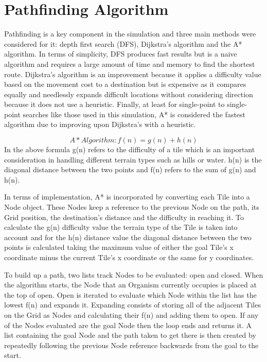 \documentclass[a4paper, oneside, 11pt]{report}
\begin{document}
\section{Pathfinding Algorithm}\label{pathfinding}
Pathfinding is a key component in the simulation and three main methods were considered for it: depth first search (DFS), Dijkstra's algorithm and the A* algorithm. In terms of simplicity, DFS produces fast results but is a naive algorithm and requires a large amount of time and memory to find the shortest route. Dijkstra's algorithm is an improvement because it applies a difficulty value based on the movement cost to a destination but is expensive as it compares equally and needlessly expands difficult locations without considering direction because it does not use a heuristic. Finally, at least for single-point to single-point searches like those used in this simulation, A* is considered the fastest algorithm \cite{belwariar} due to improving upon Dijkstra's with a heuristic. 

\[A* Algorithm: f(n) = g(n) + h(n)\]
In the above formula g(n) refers to the difficulty of a tile which is an important consideration in handling different terrain types such as hills or water. h(n) is the diagonal distance between the two points and f(n) refers to the sum of g(n) and h(n).

In terms of implementation, A* is incorporated by converting each Tile into a Node object. These Nodes keep a reference to the previous Node on the path, its Grid position, the destination's distance and the difficulty in reaching it. To calculate the g(n) difficulty value the terrain type of the Tile is taken into account and for the h(n) distance value the diagonal distance between the two points is calculated taking the maximum value of either the goal Tile's x coordinate minus the current Tile's x coordinate or the same for y coordinates. 

To build up a path, two lists track Nodes to be evaluated: open and closed. When the algorithm starts, the Node that an Organism currently occupies is placed at the top of open. Open is iterated to evaluate which Node within the list has the lowest f(n) and expands it. Expanding consists of storing all of the adjacent Tiles on the Grid as Nodes and calculating their f(n) and adding them to open. If any of the Nodes evaluated are the goal Node then the loop ends and returns it. A list containing the goal Node and the path taken to get there is then created by repeatedly following the previous Node reference backwards from the goal to the start.
\end{document}
